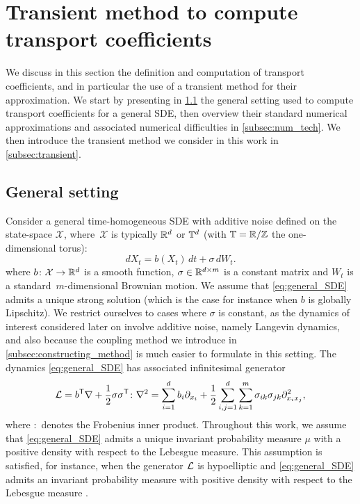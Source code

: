 \section{Transient method to compute transport coefficients}
\label{sec:trans_coeff}
%
We discuss in this section the definition and computation of transport coefficients, and in particular the use of a transient method for their approximation. We start by presenting in \cref{subsec:gen_setting} the general setting used to compute transport coefficients for a general SDE, then overview their standard numerical approximations and associated numerical difficulties in \cref{subsec:num_tech}. We then introduce the transient method we consider in this work in \cref{subsec:transient}.

\subsection{General setting}
\label{subsec:gen_setting}
%
Consider a general time-homogeneous SDE with additive noise defined on the state-space $\mathcal{X}$, where~$\mathcal{X}$ is typically $\mathbb{R}^d$ or $\mathbb{T}^d$ (with $\mathbb{T} = \mathbb{R}/\mathbb{Z}$ the one-dimensional torus):
%
\begin{equation}
    dX_t = b(X_t) \, dt + \sigma \, dW_t.
    \label{eq:general_SDE}
\end{equation}
%
where $b\colon \mathcal{X} \to \mathbb{R}^d$ is a smooth function, $\sigma \in \mathbb{R}^{d\times m}$ is a constant matrix and $W_t$ is a standard~$m$-dimensional Brownian motion. We assume that \eqref{eq:general_SDE} admits a unique strong solution (which is the case for instance when $b$ is globally Lipschitz). We restrict ourselves to cases where $\sigma$ is constant, as the dynamics of interest considered later on involve additive noise, namely Langevin dynamics, and also because the coupling method we introduce in \cref{subsec:constructing_method} is much easier to formulate in this setting. The dynamics \eqref{eq:general_SDE} has associated infinitesimal generator
%
\begin{equation}
    \mathcal{L} = b^\mathsf T\nabla + \frac{1}{2}\sigma\sigma^\mathsf T \colon \nabla^2 = \sum_{i=1}^d b_i\partial_{x_i} + \frac{1}{2}\sum_{i,j=1}^d\sum_{k=1}^m \sigma_{ik}\sigma_{jk} \partial_{x_ix_j}^2,
    \label{eq:general_generator}
\end{equation}
%
where $\colon$ denotes the Frobenius inner product. Throughout this work, we assume that \eqref{eq:general_SDE} admits a unique invariant probability measure $\mu$ with a positive density with respect to the Lebesgue measure. This assumption is satisfied, for instance, when the generator $\mathcal{L}$ is hypoelliptic and \eqref{eq:general_SDE} admits an invariant probability measure with positive density with respect to the Lebesgue measure \cite{kliemann1987}.

